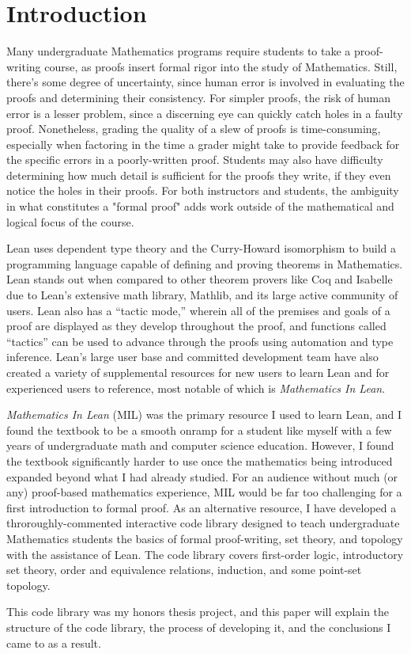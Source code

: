 
\chapter{Introduction}

Many undergraduate Mathematics programs require students to take 
a proof-writing course, as proofs insert formal rigor into the 
study of Mathematics. Still, there’s some degree of uncertainty, 
since human error is involved in evaluating the proofs and 
determining their consistency. For 
simpler proofs, the risk of human error is a lesser problem, 
since a discerning eye can quickly catch holes in a faulty proof. 
Nonetheless, grading the quality of a slew of proofs is 
time-consuming, especially when factoring in the time a grader 
might take to provide feedback for the specific errors in a 
poorly-written proof. Students may also have difficulty
determining how much detail is sufficient for the proofs they
write, if they even notice the holes in their proofs. For 
both instructors and students, the ambiguity in what constitutes
a "formal proof" adds work outside of the mathematical and 
logical focus of the course.

Lean uses dependent type theory and the Curry-Howard isomorphism 
to build a programming language capable of defining and proving 
theorems in Mathematics. Lean stands out when compared to other
theorem provers like Coq and Isabelle due to Lean's
extensive math library, Mathlib, and its large active community 
of users. Lean also has a “tactic mode,” wherein all of the 
premises and goals of a proof are displayed 
as they develop throughout the proof, and functions called 
“tactics” can be used to advance through the proofs using 
automation and type inference. Lean’s large user base and 
committed development team have also created a variety of 
supplemental resources for new users to learn Lean and for 
experienced users to reference, most notable of which is 
\textit{Mathematics In Lean}.

\textit{Mathematics In Lean} (MIL) was the primary resource I used 
to learn Lean, and I found the textbook to be a smooth
onramp for a student like myself with a few years of undergraduate
math and computer science education. However, I found the textbook
significantly harder to use once the mathematics being introduced 
expanded beyond what I had already studied. For an audience without
much (or any) proof-based mathematics experience, MIL would be 
far too challenging for a first introduction to formal proof.
As an alternative resource, I have developed a throroughly-commented
interactive code library designed to teach undergraduate Mathematics
students the basics of formal proof-writing, set theory, and topology 
with the assistance of Lean. The code library covers first-order logic,
introductory set theory, order and equivalence relations, induction, and
some point-set topology. 

This code library was my honors thesis project, and this paper
will explain the structure of the code library, the process of
developing it, and the conclusions I came to as a result.